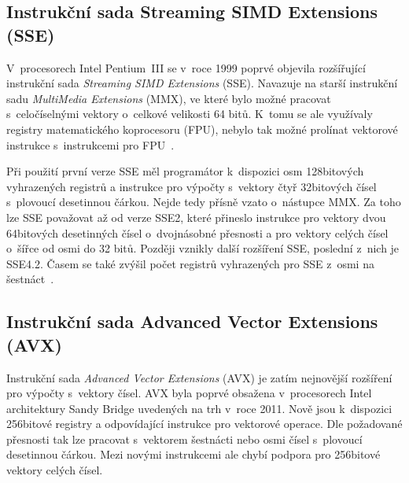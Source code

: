 \subsection{Instrukční sada Streaming SIMD Extensions (SSE)}

V~procesorech Intel Pentium~III se v~roce 1999 poprvé objevila rozšířující instrukční sada \emph{Streaming SIMD Extensions} (SSE). Navazuje na starší instrukční sadu \emph{MultiMedia Extensions} (MMX), ve které bylo možné pracovat s~celočíselnými vektory o~celkové velikosti 64 bitů. K~tomu se ale využívaly registry matematického koprocesoru (FPU), nebylo tak možné prolínat vektorové instrukce s~instrukcemi pro FPU~\cite{IntelMMX}.

Při použití první verze SSE měl programátor k~dispozici osm 128bitových vyhrazených registrů a instrukce pro výpočty s~vektory čtyř 32bitových čísel s~plovoucí desetinnou čárkou. Nejde tedy přísně vzato o~nástupce MMX. Za toho lze SSE považovat až od verze SSE2, které přineslo instrukce pro vektory dvou 64bitových desetinných čísel o~dvojnásobné přesnosti a pro vektory celých čísel o~šířce od osmi do 32 bitů. Později vznikly další rozšíření SSE, poslední z~nich je SSE4.2. Časem se také zvýšil počet registrů vyhrazených pro SSE z~osmi na šestnáct~\cite{IntelSSEDefine, IntelSSE}.






\subsection{Instrukční sada Advanced Vector Extensions (AVX)}


Instrukční sada \emph{Advanced Vector Extensions} (AVX) je zatím nejnovější rozšíření pro výpočty s~vektory čísel. AVX byla poprvé obsažena v~procesorech Intel architektury Sandy Bridge uvedených na trh v~roce 2011. Nově jsou k~dispozici 256bitové registry a odpovídající instrukce pro vektorové operace. Dle požadované přesnosti tak lze pracovat s~vektorem šestnácti nebo osmi čísel s~plovoucí desetinnou čárkou. Mezi novými instrukcemi ale chybí podpora pro 256bitové vektory celých čísel.

